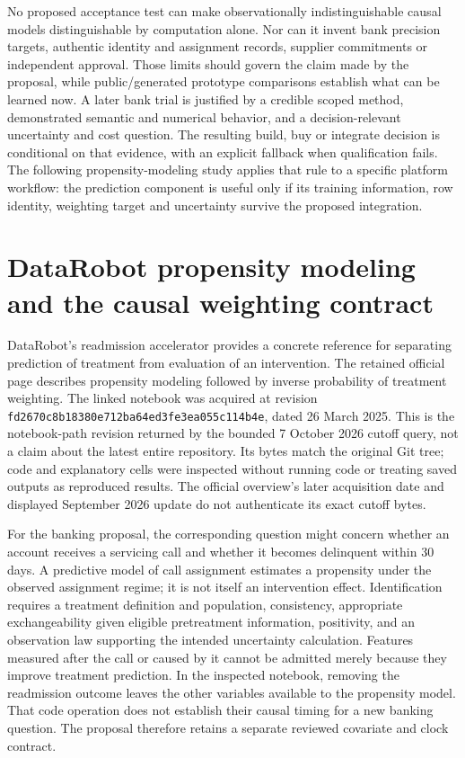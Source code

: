 No proposed acceptance test can make observationally indistinguishable causal
models distinguishable by computation alone. Nor can it invent bank precision
targets, authentic identity and assignment records, supplier commitments or
independent approval. Those limits should govern the claim made by the
proposal, while public/generated prototype comparisons establish what can be
learned now. A later bank trial is justified by a credible scoped method,
demonstrated semantic and numerical behavior, and a decision-relevant
uncertainty and cost question. The resulting build, buy or integrate decision
is conditional on that evidence, with an explicit fallback when qualification
fails. The following propensity-modeling study applies that rule to a
specific platform workflow: the prediction component is useful only if its
training information, row identity, weighting target and uncertainty survive
the proposed integration.
\label{exec16:s10-end}


\section{DataRobot propensity modeling and the causal weighting contract}
\label{sec:exec25-datarobot-reuse}
DataRobot's readmission accelerator provides a concrete reference for separating
prediction of treatment from evaluation of an intervention. The retained
official page describes propensity modeling followed by inverse probability
of treatment weighting. The linked notebook was acquired at revision
\texttt{fd2670c8b18380e712ba}\allowbreak\texttt{64ed3fe3ea055c114b4e},
dated 26 March 2025. This is the notebook-path revision returned by the bounded
7 October 2026 cutoff query, not a claim about the latest entire repository.
Its bytes match the original Git tree; code and explanatory cells were
inspected without running code or treating saved outputs as reproduced results.
The official overview's later acquisition date and displayed September 2026
update do not authenticate its exact cutoff bytes.~\citep{exec13_ch_datarobot,exec25_datarobot_notebook}

For the banking proposal, the corresponding question might concern whether
an account receives a servicing call and whether it becomes delinquent within
30 days. A predictive model of call assignment estimates a propensity under
the observed assignment regime; it is not itself an intervention effect.
Identification requires a treatment definition and population, consistency,
appropriate exchangeability given eligible pretreatment information, positivity,
and an observation law supporting the intended uncertainty calculation.
Features measured after the call or caused by it cannot be admitted merely
because they improve treatment prediction. In the inspected notebook, removing
the readmission outcome leaves the other variables available to the propensity
model. That code operation does not establish their causal timing for a new
banking question. The proposal therefore retains a separate reviewed covariate
and clock contract.~\citep{exec25_datarobot_notebook,exec25_datarobot_choice}

